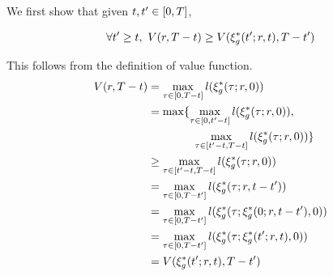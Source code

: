 \begin{IEEEproof}
  
  We first show that given $t, t' \in [0, T]$,
  
  \begin{equation} \label{eq:vf_nondec}
    \forall \tvar' \ge \tvar, ~\valfunc(\rstate, \thor - \tvar) \ge \valfunc(\rtraj^*(\tvar'; \rstate, \tvar), \thor - \tvar')
  \end{equation}
  
  This follows from the definition of value function.
  \begin{subequations} \label{eq:fin_thor_steps}
    \begin{align}
      \valfunc(\rstate, \thor - \tvar) & = \max_{\tau \in [0, \thor-\tvar]} \errfunc(\rtraj^*(\tau; \rstate, 0)) \label{eq:fin_thor_steps:1} \\
      & = \max\{ \max_{\tau \in [0, \tvar'-\tvar]} \errfunc(\rtraj^*(\tau; \rstate, 0)), \nonumber\\
      &\qquad\qquad \max_{\tau \in [\tvar'-\tvar, \thor-\tvar]} \errfunc(\rtraj^*(\tau; \rstate, 0)) \} \label{eq:fin_thor_steps:2}\\
      & \ge \max_{\tau \in [\tvar'-\tvar, \thor-\tvar]} \errfunc(\rtraj^*(\tau; \rstate, 0)) \label{eq:fin_thor_steps:3}\\
      & = \max_{\tau \in [0, \thor-\tvar']} \errfunc(\rtraj^*(\tau; \rstate, \tvar-\tvar')) \label{eq:fin_thor_steps:4}\\
      & = \max_{\tau \in [0, \thor-\tvar']} \errfunc(\rtraj^*(\tau; \rtraj^*(0; \rstate, \tvar-\tvar'), 0)) \label{eq:fin_thor_steps:5}\\  
      & = \max_{\tau \in [0, \thor-\tvar']} \errfunc(\rtraj^*(\tau; \rtraj^*(\tvar'; \rstate, \tvar), 0)) \label{eq:fin_thor_steps:6}\\      
      & = \valfunc(\rtraj^*(\tvar'; \rstate, \tvar), \thor - \tvar') \label{eq:fin_thor_steps:7}
    \end{align}
  \end{subequations}


\end{IEEEproof}
